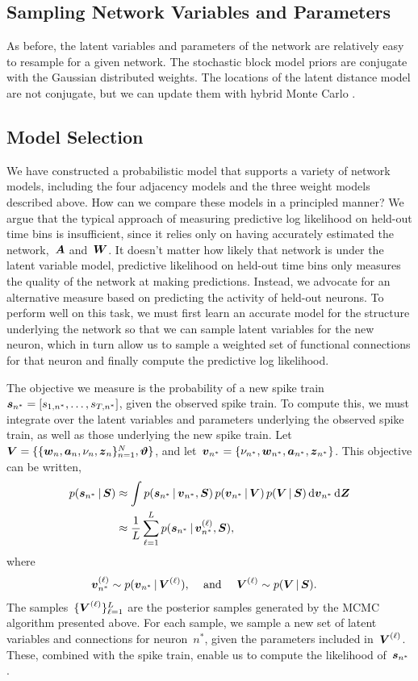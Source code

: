 \subsection{Sampling Network Variables and Parameters}
As before, the latent variables and parameters of the network are relatively 
easy to resample for a given network. The stochastic block model priors are 
conjugate with the Gaussian distributed weights. The locations of the latent 
distance model are not conjugate, but we can update them with hybrid Monte Carlo
\cite{Neal10}.

\subsection{Model Selection}
We have constructed a probabilistic model that supports a variety
of network models, including the four adjacency models and the three
weight models described above. How can we compare these models in
a principled manner? We argue that the typical approach of measuring
predictive log likelihood on held-out time bins is insufficient, since
it relies only on having accurately estimated the network,~$\boldsymbol{A}$ and~$\boldsymbol{W}$.
It doesn't matter how likely that network is under the latent variable
model, predictive likelihood on held-out time bins only measures the
quality of the network at making predictions. Instead, we advocate
for an alternative measure based on predicting the activity of held-out
neurons. To perform well on this task, we must first learn an accurate
model for the structure underlying the network so that we can
sample latent variables for the new neuron, which in turn allow us to
sample a weighted set of functional connections for that neuron and
finally compute the predictive log likelihood.

The objective we measure is the probability of a new spike
train~$\boldsymbol{s}_{n^*}=[s_{1,n^*}, \ldots, s_{T,n^*}]$, given the
observed spike train. To compute this, we must integrate
over the latent variables and parameters underlying the
observed spike train, as well as those underlying the
new spike train. 
Let~$\boldsymbol{V} = \{\{\boldsymbol{w}_n, \boldsymbol{a}_n, \nu_n, \boldsymbol{z}_n\}_{n=1}^N, \boldsymbol{\vartheta}\}$, and
let~$\boldsymbol{v}_{n^*} = \{\nu_{n^*}, \boldsymbol{w}_{n^*}, \boldsymbol{a}_{n^*}, \boldsymbol{z}_{n^*}\}$.
This objective can be written,
\begin{align}
  p(\boldsymbol{s}_{n^*} \,|\, \boldsymbol{S}) &\approx
  \int p(\boldsymbol{s}_{n^*} \,|\, \boldsymbol{v}_{n^*}, \boldsymbol{S}) \, p(\boldsymbol{v}_{n^*} \,|\, \boldsymbol{V}) \, p(\boldsymbol{V} \,|\, \boldsymbol{S}) \,
  \mathrm{d} \boldsymbol{v}_{n^*} \, \mathrm{d} \boldsymbol{Z} \\
  &\approx
  \frac{1}{L} \sum_{\ell=1}^L p(\boldsymbol{s}_{n^*} \,|\, \boldsymbol{v}_{n^*}^{(\ell)}, \boldsymbol{S}),
\end{align}
where
\begin{align}
  \boldsymbol{v}_{n^*}^{(\ell)} &\sim p(\boldsymbol{v}_{n^*} \,|\, \boldsymbol{V}^{(\ell)}),
  &\text{ and }& & 
  \boldsymbol{V}^{(\ell)} &\sim p(\boldsymbol{V} \,|\, \boldsymbol{S}).
\end{align}
The samples~$\{\boldsymbol{V}^{(\ell)}\}_{\ell=1}^L$ are the posterior samples generated
by the MCMC algorithm presented above. For each sample, we
sample a new set of latent variables and connections for neuron~$n^*$,
given the parameters included in~$\boldsymbol{V}^{(\ell)}$. These, combined with
the spike train, enable us to compute the likelihood of~$\boldsymbol{s}_{n^*}$.

